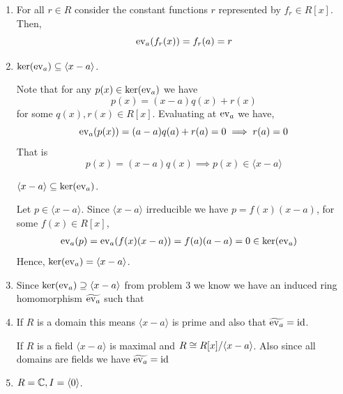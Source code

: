 \documentclass[Notebook.tex]{subfiles}
\begin{document}
\begin{solution}
    \bbni
    
    \begin{enumerate}[label=(\alph*),ref=\theenumi\alph*]
        \item For all $r \in R$ consider the constant functions $r$ represented by $f_r \in R[x]$. Then, 
        \[\operatorname{ev}_a(f_r(x)) = f_r(a) = r\]

        \item $\ker(\operatorname{ev}_a) \subseteq \langle x-a \rangle$. 
        
        Note that for any $p(x) \in \ker(\operatorname{ev}_a)$ we have 
        \[p(x) = (x-a)q(x) + r(x)\]
        for some $q(x), r(x) \in R[x]$. Evaluating at $\operatorname{ev}_a$ we have, 
        \[\operatorname{ev}_a(p(x)) = (a-a)q(a) + r(a) = 0 \implies r(a) = 0 \] 
        That is 
        \[ p(x) = (x-a)q(x) \implies p(x) \in \langle x -a \rangle\]
        
        
        $\langle x -a \rangle \subseteq  \ker(\operatorname{ev}_a)$. 
        
        
        Let $p \in \langle x - a \rangle$. Since $\langle x -a \rangle$ irreducible we have $p = f(x) (x-a)$, for some $f(x) \in R[x]$,
        \begin{align*}
            \operatorname{ev}_a(p) &= \operatorname{ev}_a(f(x)(x-a)) = f(a)(a-a) = 0  \in \ker(\operatorname{ev}_a)
        \end{align*}
        Hence, $\ker(\operatorname{ev}_a) = \langle x-a \rangle$. 

        \item Since $\ker(\operatorname{ev}_a) \supseteq \langle x-a \rangle$ from problem 3 we know we have an induced ring homomorphism $\widetilde{\operatorname{ev}_a}$ such that
        \begin{center}
      \end{center}

      \item If $R$ is a domain this means $\langle x -a \rangle$ is prime and also that $\widetilde{\operatorname{ev}_a} = \operatorname{id}$. 
      
      If $R$ is a field $\langle x- a\rangle$ is maximal and $R \cong R[x] /\langle x-a \rangle$. Also since all domains are fields we have $\widetilde{\operatorname{ev}_a} = \operatorname{id}$
      
      \item $R = \mathbb C, I = \langle 0 \rangle$. 
    \end{enumerate}
\end{solution}
\end{document}
